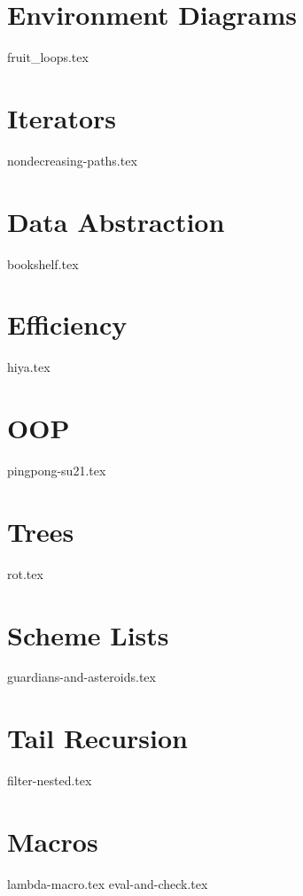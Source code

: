 \documentclass{exam}
\begin{document}
\begin{questions}
\section{Environment Diagrams}
{fruit_loops.tex}

\newpage
\section{Iterators}
{nondecreasing-paths.tex}

\section{Data Abstraction}
{bookshelf.tex}

\section{Efficiency}
{hiya.tex}

\section{OOP}
{pingpong-su21.tex}

\section{Trees}
{rot.tex}

\section{Scheme Lists}
{guardians-and-asteroids.tex}

\section{Tail Recursion}
{filter-nested.tex}

\section{Macros}
{lambda-macro.tex}
{eval-and-check.tex}
\end{questions}
\end{document}

